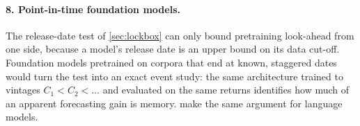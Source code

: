 \paragraph{8. Point-in-time foundation models.}
The release-date test of \cref{sec:lockbox} can only bound pretraining look-ahead from one side,
because a model's release date is an upper bound on its data cut-off. Foundation models pretrained on
corpora that end at known, staggered dates would turn the test into an exact event study: the same
architecture trained to vintages $C_1<C_2<\dots$ and evaluated on the same returns identifies how much
of an apparent forecasting gain is memory. \citet{sarkar2024lookahead} make the same argument for
language models.

